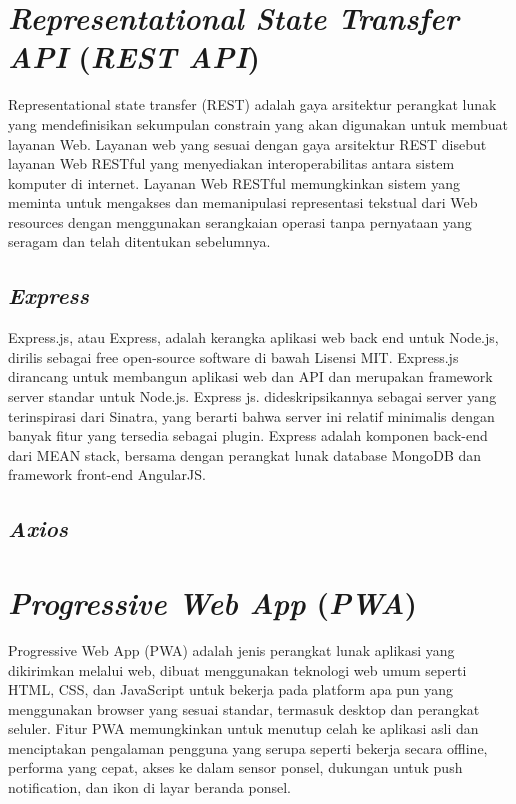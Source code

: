 \section{\emph{Representational State Transfer API} (\emph{REST API})}
\vspace{1ex}
Representational state transfer (REST) adalah gaya arsitektur perangkat lunak yang mendefinisikan sekumpulan constrain
yang akan digunakan untuk membuat layanan Web. Layanan web yang sesuai dengan gaya arsitektur REST disebut
layanan Web RESTful yang menyediakan interoperabilitas antara sistem komputer di internet. Layanan Web RESTful
memungkinkan sistem yang meminta untuk mengakses dan memanipulasi representasi tekstual dari Web resources
dengan menggunakan serangkaian operasi tanpa pernyataan yang seragam dan telah ditentukan sebelumnya.

\lipsum[5]
\vspace{0.5ex}

\subsection{\emph{Express}}
\vspace{1ex}
Express.js, atau Express, adalah kerangka aplikasi web back end untuk Node.js, dirilis sebagai free open-source
software di bawah Lisensi MIT. Express.js dirancang untuk membangun aplikasi web dan API dan merupakan
framework server standar untuk Node.js. Express js. dideskripsikannya sebagai server yang terinspirasi dari Sinatra,
yang berarti bahwa server ini relatif minimalis dengan banyak fitur yang tersedia sebagai plugin. Express adalah
komponen back-end dari MEAN stack, bersama dengan perangkat lunak database MongoDB dan framework front-end AngularJS.
\vspace{0.5ex}

\subsection{\emph{Axios}}
\vspace{1ex}

\lipsum[7]
\vspace{0.5ex}

\section{\emph{Progressive Web App} (\emph{PWA})}
\vspace{1ex}
Progressive Web App (PWA) adalah jenis perangkat lunak aplikasi yang dikirimkan melalui web, dibuat menggunakan
teknologi web umum seperti HTML, CSS, dan JavaScript untuk bekerja pada platform apa pun yang menggunakan browser
yang sesuai standar, termasuk desktop dan perangkat seluler.
Fitur PWA memungkinkan untuk menutup celah ke aplikasi asli dan menciptakan pengalaman pengguna yang serupa seperti
bekerja secara offline, performa yang cepat, akses ke dalam sensor ponsel, dukungan untuk push notification, dan
ikon di layar beranda ponsel.
\vspace{0.5ex}

